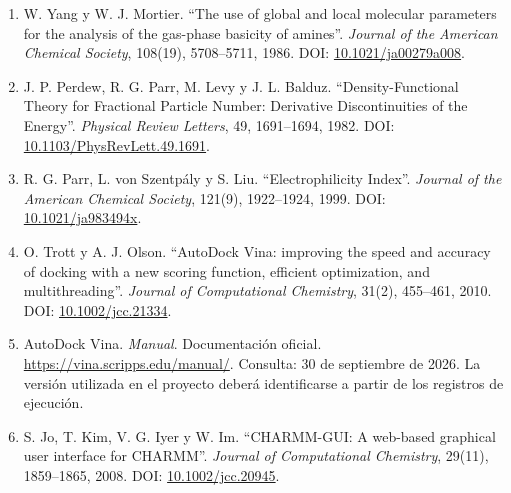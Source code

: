 \begin{enumerate}
\item\label{anexo-ref-7} W. Yang y W. J. Mortier. ``The use of global and local molecular parameters for the analysis of the gas-phase basicity of amines''. \textit{Journal of the American Chemical Society}, 108(19), 5708--5711, 1986. DOI: \href{https://doi.org/10.1021/ja00279a008}{10.1021/ja00279a008}.

\item\label{anexo-ref-8} J. P. Perdew, R. G. Parr, M. Levy y J. L. Balduz. ``Density-Functional Theory for Fractional Particle Number: Derivative Discontinuities of the Energy''. \textit{Physical Review Letters}, 49, 1691--1694, 1982. DOI: \href{https://doi.org/10.1103/PhysRevLett.49.1691}{10.1103/PhysRevLett.49.1691}.

\item\label{anexo-ref-9} R. G. Parr, L. von Szentpály y S. Liu. ``Electrophilicity Index''. \textit{Journal of the American Chemical Society}, 121(9), 1922--1924, 1999. DOI: \href{https://doi.org/10.1021/ja983494x}{10.1021/ja983494x}.

\item\label{anexo-ref-10} O. Trott y A. J. Olson. ``AutoDock Vina: improving the speed and accuracy of docking with a new scoring function, efficient optimization, and multithreading''. \textit{Journal of Computational Chemistry}, 31(2), 455--461, 2010. DOI: \href{https://doi.org/10.1002/jcc.21334}{10.1002/jcc.21334}.

\item\label{anexo-ref-11} AutoDock Vina. \textit{Manual}. Documentación oficial. \url{https://vina.scripps.edu/manual/}. Consulta: 30 de septiembre de 2026. La versión utilizada en el proyecto deberá identificarse a partir de los registros de ejecución.

\item\label{anexo-ref-12} S. Jo, T. Kim, V. G. Iyer y W. Im. ``CHARMM-GUI: A web-based graphical user interface for CHARMM''. \textit{Journal of Computational Chemistry}, 29(11), 1859--1865, 2008. DOI: \href{https://doi.org/10.1002/jcc.20945}{10.1002/jcc.20945}.

\end{enumerate}
\endgroup